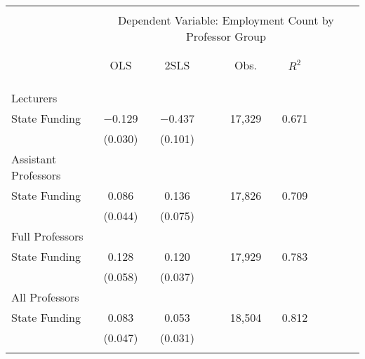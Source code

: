 
\begin{tabular}{@{\extracolsep{5pt}}lcccccccc} 
\\[-1.8ex]\hline 
\hline \\[-1.8ex] 
 & \multicolumn{8}{c}{Dependent Variable: Employment Count by Professor Group} \\ 
\cline{2-9} 
\\[-1.8ex] \\ 
 & OLS & 2SLS & & Obs. & $R^2$\\ 
\\[-1.8ex] \\ 
\hline \\[-1.8ex] 
Lecturers \\
 State Funding & $-$0.129 & $-$0.437 & & 17,329 & 0.671 \\ 
  & (0.030) & (0.101) \\ 
Assistant Professors \\
 State Funding & 0.086 & 0.136 & & 17,826 & 0.709 \\ 
  & (0.044) & (0.075) \\ 
Full Professors\\
 State Funding & 0.128 & 0.120 & & 17,929 & 0.783 \\ 
  & (0.058) & (0.037) \\ 
All Professors\\
 State Funding & 0.083 & 0.053 & & 18,504 & 0.812 \\ 
  & (0.047) & (0.031) \\ 
\hline 
\hline \\[-1.8ex] 
\end{tabular} 
